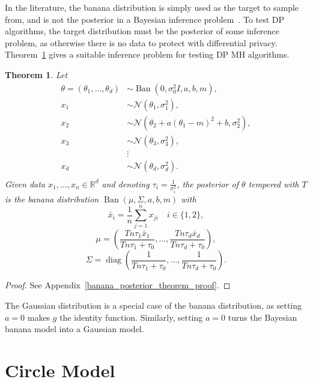 \documentclass[english,twoside,openright]{HYgraduMLDS}
\newtheorem{theorem}[lemma]{Theorem}
\newcommand{\R}{\mathbb{R}}
\newcommand{\caln}{{\mathcal{N}}}
\DeclareMathOperator{\ban}{Ban}
\DeclareMathOperator{\diag}{diag}
\begin{document}
In the literature, the banana distribution is simply used as the target to
sample from, and is not the posterior in a Bayesian inference
problem~\cite{TPK14}. To test DP algorithms, the
target distribution must be the posterior of some inference problem, as
otherwise there is no data to protect with differential privacy.
Theorem~\ref{banana_posterior_theorem} gives a suitable inference problem
for testing DP MH algorithms.

\begin{theorem}\label{banana_posterior_theorem}
    Let
    \begin{align*}
        \theta = (\theta_1,\dotsc, \theta_d) &\sim
        \ban(0, \sigma_0^2I, a, b, m), \\
        x_1 &\sim \caln(\theta_1, \sigma_1^2), \\
        x_2 &\sim \caln(\theta_2 + a(\theta_1 - m)^2 + b, \sigma_2^2),\\
        x_3 &\sim \caln(\theta_3, \sigma_3^2), \\
            &\vdots \\
        x_d &\sim \caln(\theta_d, \sigma_d^2). \\
    \end{align*}
    Given data \(x_1,\dotsc, x_n\in \R^d\) and
    denoting \(\tau_i = \frac{1}{\sigma_i^2}\),
    the posterior of \(\theta\) tempered with \(T\) is the banana distribution
    \(\ban(\mu, \Sigma, a, b, m)\)
    with
    \[
        \bar{x}_i = \frac{1}{n}\sum_{j=1}^n x_{ji} \quad i\in \{1, 2\},
    \]
    \[
        \mu = \left(\frac{Tn\tau_1\bar{x}_1}{Tn\tau_1 + \tau_0},\dotsc,
        \frac{Tn\tau_d\bar{x}_d}{Tn\tau_d + \tau_0}\right),
    \]
    \[
        \Sigma = \diag\left(
            \frac{1}{Tn\tau_1 + \tau_0},\dotsc,
            \frac{1}{Tn\tau_d + \tau_0}
        \right).
    \]
\end{theorem}
\begin{proof}
  See Appendix~\ref{banana_posterior_theorem_proof}.
\end{proof}
\setcounter{banana_posterior_theorem_number}{\value{lemma}}

The Gaussian distribution is a special case of the banana distribution,
as setting \(a = 0\) makes \(g\) the identity function. Similarly, setting
\(a = 0\) turns the Bayesian banana model into a Gaussian model.

\section{Circle Model}\label{circle_section}
\end{document}
